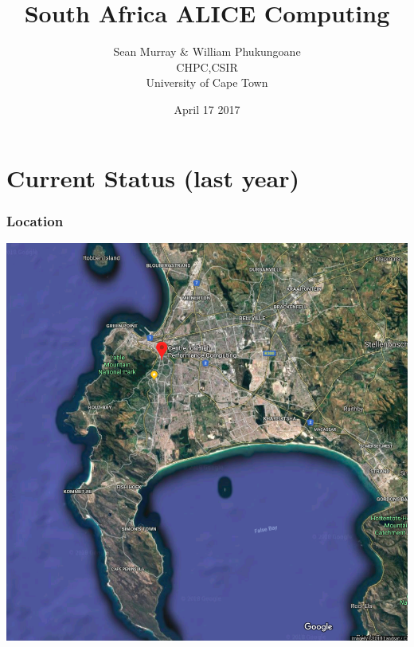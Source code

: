 \documentclass{beamer}
\title{South Africa ALICE Computing}
\author{Sean Murray \& William Phukungoane\\
    CHPC,CSIR \\
    University of Cape Town 
}
\date{April 17 2017}
\begin{document}
\begin{frame}
\titlepage
\end{frame}

\section{Current Status (last year)}
\begin{frame}
    \frametitle{Location}
\end{frame}
\begin{frame}
    \includegraphics[scale=0.5]{CPTmap.png}
\end{frame}
\end{document}
